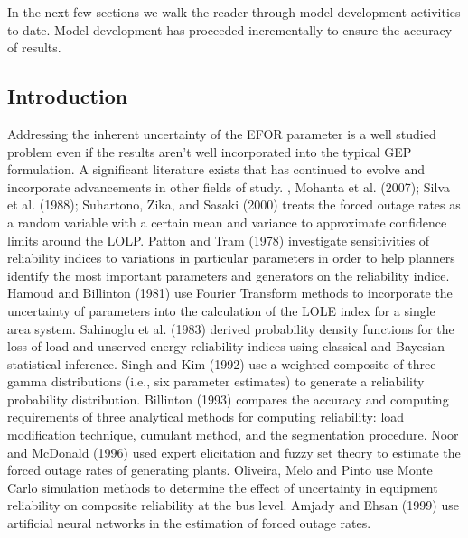 \documentclass[10pt]{amsart}
\begin{document}
In the next few sections we walk the reader through model development activities to date. 
Model development has proceeded incrementally to ensure the accuracy of results. 


\subsection{Introduction}
	
	

	
	Addressing the inherent uncertainty of the EFOR parameter is a well studied problem even if the results aren't well incorporated into the typical GEP formulation. 
	A significant literature exists that has continued to evolve and incorporate advancements in other fields of study. 
	\cite{barbosa:1977}, Mohanta et al. (2007); Silva et al. (1988); Suhartono, Zika, and Sasaki (2000) treats the forced outage rates as a random variable with a certain mean and variance to approximate confidence limits around the LOLP. 
	Patton and Tram (1978) investigate sensitivities of reliability indices to variations in particular parameters in order to help planners identify the most important parameters and generators on the reliability indice. 
	Hamoud and Billinton (1981) use Fourier Transform methods to incorporate the uncertainty of parameters into the calculation of the LOLE index for a single area system. 
	Sahinoglu et al. (1983) derived probability density functions for the loss of load and unserved energy reliability indices using classical and Bayesian statistical inference. 
	Singh and Kim (1992) use a weighted composite of three gamma distributions (i.e., six parameter estimates) to generate a reliability probability distribution. 
	Billinton (1993) compares the accuracy and computing requirements of three analytical methods for computing reliability: load modification technique, cumulant method, and the segmentation procedure. 
	Noor and McDonald (1996) used expert elicitation and fuzzy set theory to estimate the forced outage rates of generating plants. 
	Oliveira, Melo and Pinto use Monte Carlo simulation methods to determine the effect of uncertainty in equipment reliability on composite reliability at the bus level. 
	Amjady and Ehsan (1999) use artificial neural networks in the estimation of forced outage rates. 
\end{document}
